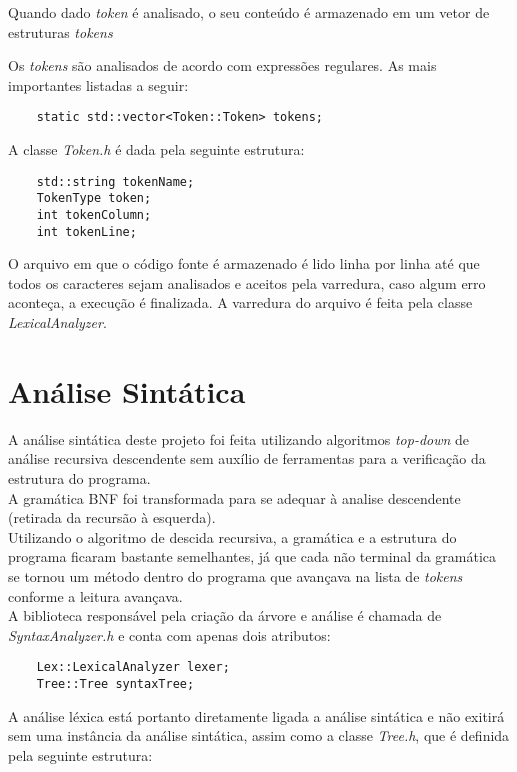 \documentclass[12pt,a4paper,final]{article}
\begin{document}
Quando dado \textit{token} é analisado, o seu conteúdo é armazenado em um vetor de estruturas \textit{tokens}

Os \textit{tokens} são analisados de acordo com expressões regulares. As mais importantes listadas a seguir:

\begin{lstlisting}
	static std::vector<Token::Token> tokens;
\end{lstlisting}

A classe \textit{Token.h} é dada pela seguinte estrutura:

\begin{lstlisting}
	std::string tokenName;
	TokenType token;
	int tokenColumn;
	int tokenLine;
\end{lstlisting}

O arquivo em que o código fonte é armazenado é lido linha por linha até que todos os caracteres sejam analisados e aceitos pela varredura, caso algum erro aconteça, a execução é finalizada.
A varredura do arquivo é feita pela classe \textit{LexicalAnalyzer}.

\section*{Análise Sintática}
A análise sintática deste projeto foi feita utilizando algoritmos \textit{top-down} de análise recursiva descendente sem auxílio de ferramentas para a verificação da estrutura do programa.\\
A gramática BNF foi transformada para se adequar à analise descendente (retirada da recursão à esquerda).\\
Utilizando o algoritmo de descida recursiva, a gramática e a estrutura do programa ficaram bastante semelhantes, já que cada não terminal da gramática se tornou um método dentro do programa que avançava na lista de \textit{tokens} conforme a leitura avançava.\\

A biblioteca responsável pela criação da árvore e análise é chamada de \textit{SyntaxAnalyzer.h} e  conta com apenas dois atributos:

\begin{lstlisting}
	Lex::LexicalAnalyzer lexer;
	Tree::Tree syntaxTree;
\end{lstlisting}

A análise léxica está portanto diretamente ligada a análise sintática e não exitirá sem uma instância da análise sintática, assim como a classe \textit{Tree.h}, que é definida pela seguinte estrutura:
\end{document}
